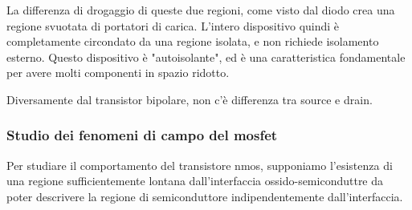 \documentclass[../template]{subfiles}
\begin{document}
La differenza di drogaggio di queste due regioni, come visto dal diodo crea una regione svuotata di portatori di carica.
L'intero dispositivo quindi è completamente circondato da una regione isolata, e non richiede isolamento esterno.
Questo dispositivo è "autoisolante", ed è una caratteristica fondamentale per avere molti componenti in spazio ridotto.

Diversamente dal transistor bipolare, non c'è differenza tra source e drain.


\subsubsection{Studio dei fenomeni di campo del mosfet}

\def\xd{3}
\def\tox{2}

\begin{figure}[h]
    \centering
\end{figure}
Per studiare il comportamento del transistore nmos, supponiamo l'esistenza di una regione sufficientemente lontana dall'interfaccia ossido-semiconduttre da poter descrivere la regione di semiconduttore indipendentemente dall'interfaccia.
\end{document}
